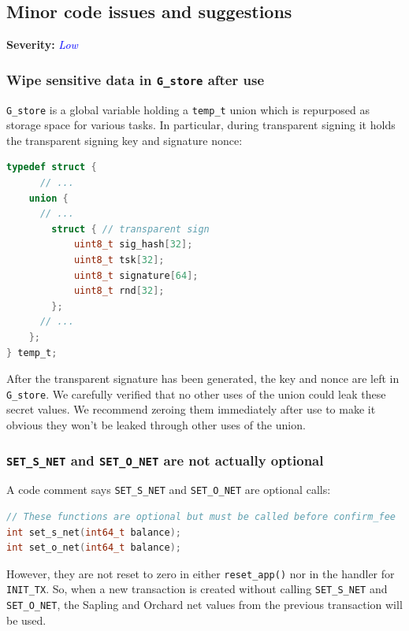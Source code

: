 \documentclass[10pt,titlepage]{article}
\newcommand{\LowIssue}{\textcolor{blue}{\emph{Low}}}
\begin{document}
\subsection{Minor code issues and suggestions} \label{issueminorcodeissues}
\textbf{Severity:} \LowIssue

\subsubsection{Wipe sensitive data in \texttt{G\_store} after use}

\texttt{G\_store} is a global variable holding a \texttt{temp\_t} union which is
repurposed as storage space for various tasks. In particular, during transparent
signing it holds the transparent signing key and signature nonce:

\begin{lstlisting}[language=c]
typedef struct {
      // ...
    union {
      // ...
        struct { // transparent sign
            uint8_t sig_hash[32];
            uint8_t tsk[32];
            uint8_t signature[64];
            uint8_t rnd[32];
        };
      // ...
    };
} temp_t;
\end{lstlisting}

After the transparent signature has been generated, the key and nonce are left
in \texttt{G\_store}. We carefully verified that no other uses of the union
could leak these secret values. We recommend zeroing them immediately after use
to make it obvious they won't be leaked through other uses of the union.

\subsubsection{\texttt{SET\_S\_NET} and \texttt{SET\_O\_NET} are not actually optional}

A code comment says \texttt{SET\_S\_NET} and \texttt{SET\_O\_NET} are optional
calls:

\begin{lstlisting}[language=c]
// These functions are optional but must be called before confirm_fee
int set_s_net(int64_t balance);
int set_o_net(int64_t balance);
\end{lstlisting}

However, they are not reset to zero in either \texttt{reset\_app()} nor in the
handler for \texttt{INIT\_TX}. So, when a new transaction is created without
calling \texttt{SET\_S\_NET} and \texttt{SET\_O\_NET}, the Sapling and Orchard
net values from the previous transaction will be used.
\end{document}
